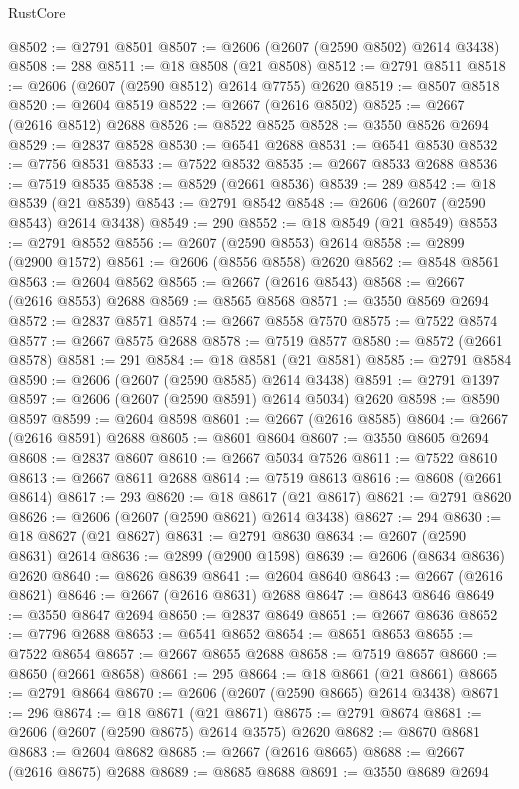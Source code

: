 \begin{lexlean}{RustCore}
\begin{coremodule}
@8502 := @2791 @8501
@8507 := @2606 (@2607 (@2590 @8502) @2614 @3438)
@8508 := 288
@8511 := @18 @8508 (@21 @8508)
@8512 := @2791 @8511
@8518 := @2606 (@2607 (@2590 @8512) @2614 @7755) @2620
@8519 := @8507 @8518
@8520 := @2604 @8519
@8522 := @2667 (@2616 @8502)
@8525 := @2667 (@2616 @8512) @2688
@8526 := @8522 @8525
@8528 := @3550 @8526 @2694
@8529 := @2837 @8528
@8530 := @6541 @2688
@8531 := @6541 @8530
@8532 := @7756 @8531
@8533 := @7522 @8532
@8535 := @2667 @8533 @2688
@8536 := @7519 @8535
@8538 := @8529 (@2661 @8536)
@8539 := 289
@8542 := @18 @8539 (@21 @8539)
@8543 := @2791 @8542
@8548 := @2606 (@2607 (@2590 @8543) @2614 @3438)
@8549 := 290
@8552 := @18 @8549 (@21 @8549)
@8553 := @2791 @8552
@8556 := @2607 (@2590 @8553) @2614
@8558 := @2899 (@2900 @1572)
@8561 := @2606 (@8556 @8558) @2620
@8562 := @8548 @8561
@8563 := @2604 @8562
@8565 := @2667 (@2616 @8543)
@8568 := @2667 (@2616 @8553) @2688
@8569 := @8565 @8568
@8571 := @3550 @8569 @2694
@8572 := @2837 @8571
@8574 := @2667 @8558 @7570
@8575 := @7522 @8574
@8577 := @2667 @8575 @2688
@8578 := @7519 @8577
@8580 := @8572 (@2661 @8578)
@8581 := 291
@8584 := @18 @8581 (@21 @8581)
@8585 := @2791 @8584
@8590 := @2606 (@2607 (@2590 @8585) @2614 @3438)
@8591 := @2791 @1397
@8597 := @2606 (@2607 (@2590 @8591) @2614 @5034) @2620
@8598 := @8590 @8597
@8599 := @2604 @8598
@8601 := @2667 (@2616 @8585)
@8604 := @2667 (@2616 @8591) @2688
@8605 := @8601 @8604
@8607 := @3550 @8605 @2694
@8608 := @2837 @8607
@8610 := @2667 @5034 @7526
@8611 := @7522 @8610
@8613 := @2667 @8611 @2688
@8614 := @7519 @8613
@8616 := @8608 (@2661 @8614)
@8617 := 293
@8620 := @18 @8617 (@21 @8617)
@8621 := @2791 @8620
@8626 := @2606 (@2607 (@2590 @8621) @2614 @3438)
@8627 := 294
@8630 := @18 @8627 (@21 @8627)
@8631 := @2791 @8630
@8634 := @2607 (@2590 @8631) @2614
@8636 := @2899 (@2900 @1598)
@8639 := @2606 (@8634 @8636) @2620
@8640 := @8626 @8639
@8641 := @2604 @8640
@8643 := @2667 (@2616 @8621)
@8646 := @2667 (@2616 @8631) @2688
@8647 := @8643 @8646
@8649 := @3550 @8647 @2694
@8650 := @2837 @8649
@8651 := @2667 @8636
@8652 := @7796 @2688
@8653 := @6541 @8652
@8654 := @8651 @8653
@8655 := @7522 @8654
@8657 := @2667 @8655 @2688
@8658 := @7519 @8657
@8660 := @8650 (@2661 @8658)
@8661 := 295
@8664 := @18 @8661 (@21 @8661)
@8665 := @2791 @8664
@8670 := @2606 (@2607 (@2590 @8665) @2614 @3438)
@8671 := 296
@8674 := @18 @8671 (@21 @8671)
@8675 := @2791 @8674
@8681 := @2606 (@2607 (@2590 @8675) @2614 @3575) @2620
@8682 := @8670 @8681
@8683 := @2604 @8682
@8685 := @2667 (@2616 @8665)
@8688 := @2667 (@2616 @8675) @2688
@8689 := @8685 @8688
@8691 := @3550 @8689 @2694

\end{coremodule}
\end{lexlean}
